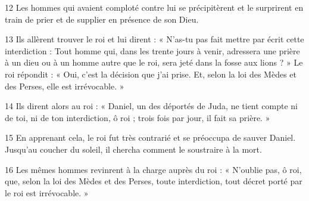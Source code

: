 12 Les hommes qui avaient comploté contre lui se précipitèrent et le surprirent en train de prier et de supplier en présence de son Dieu.

13 Ils allèrent trouver le roi et lui dirent : « N’as-tu pas fait mettre par écrit cette interdiction : Tout homme qui, dans les trente jours à venir, adressera une prière à un dieu ou à un homme autre que le roi, sera jeté dans la fosse aux lions ? » Le roi répondit : « Oui, c’est la décision que j’ai prise. Et, selon la loi des Mèdes et des Perses, elle est irrévocable. »

14 Ils dirent alors au roi : « Daniel, un des déportés de Juda, ne tient compte ni de toi, ni de ton interdiction, ô roi ; trois fois par jour, il fait sa prière. »

15 En apprenant cela, le roi fut très contrarié et se préoccupa de sauver Daniel. Jusqu’au coucher du soleil, il chercha comment le soustraire à la mort.

16 Les mêmes hommes revinrent à la charge auprès du roi : « N’oublie pas, ô roi, que, selon la loi des Mèdes et des Perses, toute interdiction, tout décret porté par le roi est irrévocable. »

